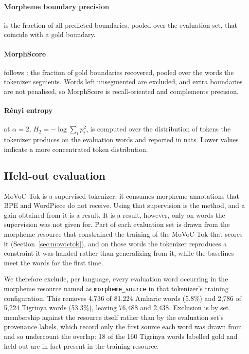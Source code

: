 \documentclass[11pt]{article}
\newcommand{\movoctok}{MoVoC-Tok}
\begin{document}
\paragraph{Morpheme boundary precision} is the fraction of all predicted
boundaries, pooled over the evaluation set, that coincide with a gold
boundary.

\paragraph{MorphScore} follows \citet{arnett-bergen-2025-language}: the
fraction of gold boundaries recovered, pooled over the words the tokenizer
segments. Words left unsegmented are excluded, and extra boundaries are not
penalised, so MorphScore is recall-oriented and complements precision.

\paragraph{Rényi entropy} \citep{renyi1961measures} at $\alpha = 2$,
$H_2 = -\log \sum_i p_i^2$, is computed over the distribution of tokens the
tokenizer produces on the evaluation words and reported in nats. Lower values
indicate a more concentrated token distribution.

\subsection{Held-out evaluation}
\label{sec:heldout}

\movoctok{} is a supervised tokenizer: it consumes morpheme annotations that
BPE and WordPiece do not receive. Using that supervision is the method, and a
gain obtained from it is a result. It is a result, however, only on words the
supervision was not given for. Part of each evaluation set is drawn from the
morpheme resource that constrained the training of the \movoctok{} that
scores it (Section~\ref{sec:movoctok}), and on those words the tokenizer
reproduces a
constraint it was handed rather than generalizing from it, while the baselines
meet the words for the first time.

We therefore exclude, per language, every evaluation word occurring in the
morpheme resource named as \texttt{morpheme\_source} in that tokenizer's
training configuration. This removes 4,736 of 81,224 Amharic words (5.8\%) and
2,786 of 5,224 Tigrinya words (53.3\%), leaving 76,488 and 2,438. Exclusion is
by set membership against the resource itself rather than by the evaluation
set's provenance labels, which record only the first source each word was drawn
from and so undercount the overlap: 18 of the 160 Tigrinya words labelled gold
and held out are in fact present in the training resource.
\end{document}
